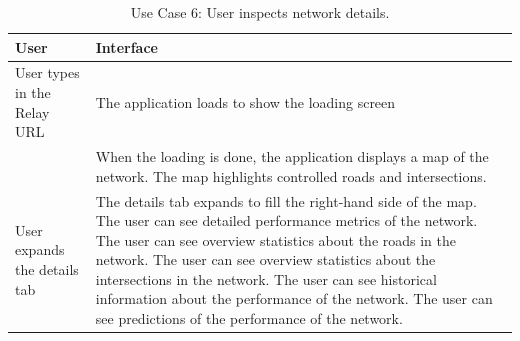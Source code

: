 \documentclass{report}
\begin{document}
\begin{table}[htbp]
\begin{centering}
    \begin{tabular}{| p{7cm} | p{7cm} |}
    \hline
    User    & Interface   \\ \hline
    User types in the Relay URL    &     The application loads to show the loading screen    \\ \hline
    ~      & When the loading is done, the application displays a map of the network. The map highlights controlled roads and intersections. \\ \hline
     User expands the details tab  &   The details tab expands to fill the right-hand side of the map. The user can see detailed performance metrics of the network. The user can see overview statistics about the roads in the network. The user can see overview statistics about the intersections in the network. The user can see historical information about the performance of the network. The user can see predictions of the performance of the network.          \\ \hline
    \end{tabular}
    \caption {Use Case 6: User inspects network details.}
    \label{use-case-6}
   \end{centering}
\end{table}
\end{document}
